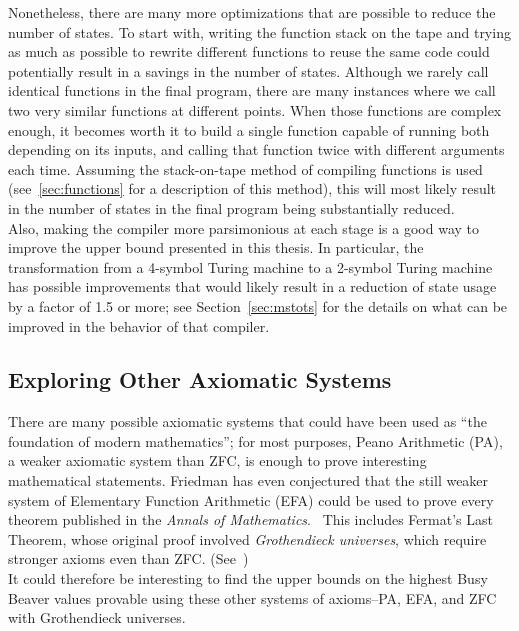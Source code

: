 \documentclass[11pt]{report}
\begin{document}
Nonetheless, there are many more optimizations that are possible to reduce the number of states. To start with, writing the function stack on the tape and trying as much as possible to rewrite different functions to reuse the same code could potentially result in a savings in the number of states. Although we rarely call identical functions in the final program, there are many instances where we call two very similar functions at different points. When those functions are complex enough, it becomes worth it to build a single function capable of running both depending on its inputs, and calling that function twice with different arguments each time. Assuming the stack-on-tape method of compiling functions is used (see~\ref{sec:functions} for a description of this method), this will most likely result in the number of states in the final program being substantially reduced. \\

Also, making the compiler more parsimonious at each stage is a good way to improve the upper bound presented in this thesis. In particular, the transformation from a 4-symbol Turing machine to a 2-symbol Turing machine has possible improvements that would likely result in a reduction of state usage by a factor of 1.5 or more; see Section~\ref{sec:mstots} for the details on what can be improved in the behavior of that compiler. \\

\subsection{Exploring Other Axiomatic Systems}

There are many possible axiomatic systems that could have been used as ``the foundation of modern mathematics''; for most purposes, Peano Arithmetic (PA), a weaker axiomatic system than ZFC, is enough to prove interesting mathematical statements. Friedman has even conjectured that the still weaker system of Elementary Function Arithmetic (EFA) could be used to prove every theorem published in the \emph{Annals of Mathematics}.~\cite{grandconjecture}
This includes Fermat's Last Theorem, whose original proof involved \emph{Grothendieck universes}, which require stronger axioms even than ZFC. (See~\cite{grothendieck}) \\ 

It could therefore be interesting to find the upper bounds on the highest Busy Beaver values provable using these other systems of axioms--PA, EFA, and ZFC with Grothendieck universes. \\
\end{document}
